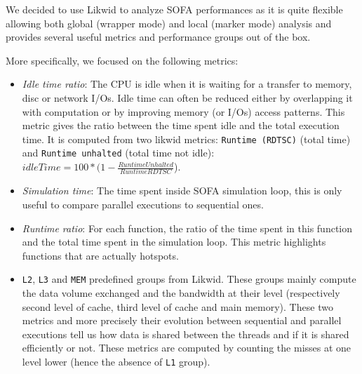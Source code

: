 We decided to use \gls{Likwid} to analyze \gls{SOFA} performances as it is quite flexible allowing both global (wrapper mode) and local (marker mode) analysis and provides several useful metrics and performance groups out of the box.

More specifically, we focused on the following metrics:
\begin{itemize}
    \item \emph{Idle time ratio}: The CPU is idle when it is waiting for a transfer to memory,  disc or network \glspl{I/O}.
        Idle time can often be reduced either by overlapping it with computation or by improving memory (or \glspl{I/O}) access patterns.
        This metric gives the ratio between the time spent idle and the total execution time.
        It is computed from two likwid metrics: \texttt{Runtime (RDTSC)} (total time) and \texttt{Runtime unhalted} (total time not idle): $idleTime=100*(1-\frac{RuntimeUnhalted}{RuntimeRDTSC}$).
    \item \emph{Simulation time}: The time spent inside \gls{SOFA} simulation loop, this is only useful to compare parallel executions to sequential ones.
    \item \emph{Runtime ratio}: For each function, the ratio of the time spent in this function and the total time spent in the simulation loop.
        This metric highlights functions that are actually hotspots.
    \item \texttt{L2}, \texttt{L3} and \texttt{MEM} predefined groups from \gls{Likwid}.
        These groups mainly compute the data volume exchanged and the bandwidth at their level (respectively second level of cache, third level of cache and main memory).
        These two metrics and more precisely their evolution between sequential and parallel executions tell us how data is shared between the threads and if it is shared efficiently or not.
        These metrics are computed by counting the misses at one level lower (hence the absence of \texttt{L1} group).
\end{itemize}


